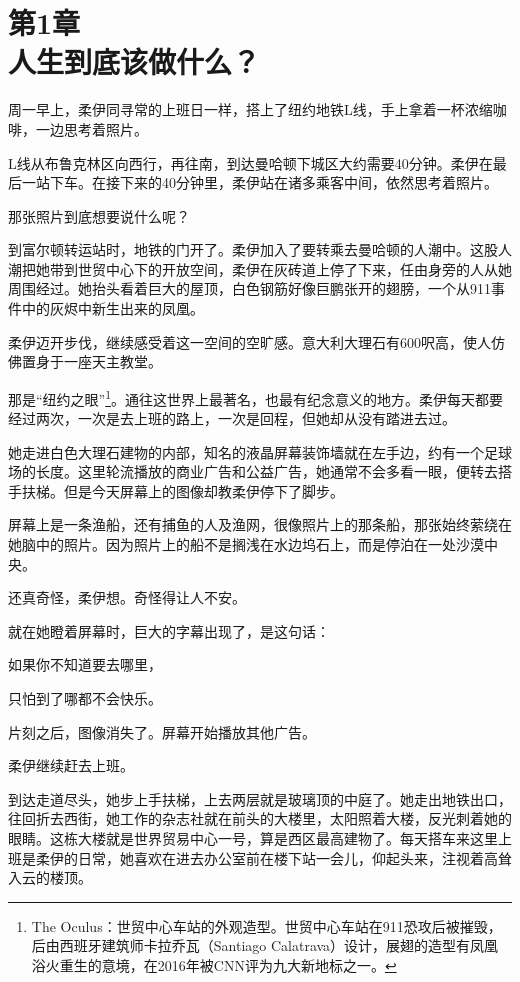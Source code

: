 \section[第1章\q 人生到底该做什么？]{第1章\\ 人生到底该做什么？}
\label{sec:ch1}

周一早上，柔伊同寻常的上班日一样，搭上了纽约地铁L线，手上拿着一杯浓缩咖啡，一边思考着照片。

L线从布鲁克林区向西行，再往南，到达曼哈顿下城区大约需要40分钟。柔伊在最后一站下车。在接下来的40分钟里，柔伊站在诸多乘客中间，依然思考着照片。

那张照片到底想要说什么呢？

到富尔顿转运站时，地铁的门开了。柔伊加入了要转乘去曼哈顿的人潮中。这股人潮把她带到世贸中心下的开放空间，柔伊在灰砖道上停了下来，任由身旁的人从她周围经过。她抬头看着巨大的屋顶，白色钢筋好像巨鹏张开的翅膀，一个从911事件中的灰烬中新生出来的凤凰。

柔伊迈开步伐，继续感受着这一空间的空旷感。意大利大理石有600呎高，使人仿佛置身于一座天主教堂。

那是“纽约之眼”\footnote{The Oculus：世贸中心车站的外观造型。世贸中心车站在911恐攻后被摧毁，后由西班牙建筑师卡拉乔瓦（Santiago Calatrava）设计，展翅的造型有凤凰浴火重生的意境，在2016年被CNN评为九大新地标之一。}。通往这世界上最著名，也最有纪念意义的地方。柔伊每天都要经过两次，一次是去上班的路上，一次是回程，但她却从没有踏进去过。

她走进白色大理石建物的内部，知名的液晶屏幕装饰墙就在左手边，约有一个足球场的长度。这里轮流播放的商业广告和公益广告，她通常不会多看一眼，便转去搭手扶梯。但是今天屏幕上的图像却教柔伊停下了脚步。

屏幕上是一条渔船，还有捕鱼的人及渔网，很像照片上的那条船，那张始终萦绕在她脑中的照片。因为照片上的船不是搁浅在水边坞石上，而是停泊在一处沙漠中央。

还真奇怪，柔伊想。奇怪得让人不安。

就在她瞪着屏幕时，巨大的字幕出现了，是这句话：

{\kaishu 如果你不知道要去哪里，}

{\kaishu 只怕到了哪都不会快乐。}

片刻之后，图像消失了。屏幕开始播放其他广告。

柔伊继续赶去上班。

到达走道尽头，她步上手扶梯，上去两层就是玻璃顶的中庭了。她走出地铁出口，往回折去西街，她工作的杂志社就在前头的大楼里，太阳照着大楼，反光刺着她的眼睛。这栋大楼就是世界贸易中心一号，算是西区最高建物了。每天搭车来这里上班是柔伊的日常，她喜欢在进去办公室前在楼下站一会儿，仰起头来，注视着高耸入云的楼顶。

